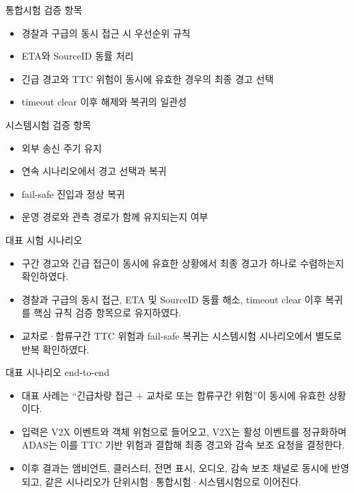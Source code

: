 \documentclass[aspectratio=169,10pt]{beamer}
\begin{document}
\begin{frame}{통합시험 검증 항목}
\begin{itemize}
  \item 경찰과 구급의 동시 접근 시 우선순위 규칙
  \item ETA와 SourceID 동률 처리
  \item 긴급 경고와 TTC 위험이 동시에 유효한 경우의 최종 경고 선택
  \item timeout clear 이후 해제와 복귀의 일관성
\end{itemize}
\end{frame}

\begin{frame}{시스템시험 검증 항목}
\begin{itemize}
  \item 외부 송신 주기 유지
  \item 연속 시나리오에서 경고 선택과 복귀
  \item fail-safe 진입과 정상 복귀
  \item 운영 경로와 관측 경로가 함께 유지되는지 여부
\end{itemize}
\end{frame}

\begin{frame}{대표 시험 시나리오}
\begin{itemize}
  \item 구간 경고와 긴급 접근이 동시에 유효한 상황에서 최종 경고가 하나로 수렴하는지 확인하였다.
  \item 경찰과 구급의 동시 접근, ETA 및 SourceID 동률 해소, timeout clear 이후 복귀를 핵심 규칙 검증 항목으로 유지하였다.
  \item 교차로·합류구간 TTC 위험과 fail-safe 복귀는 시스템시험 시나리오에서 별도로 반복 확인하였다.
\end{itemize}
\end{frame}

\begin{frame}{대표 시나리오 end-to-end}
\begin{itemize}
  \item 대표 사례는 ``긴급차량 접근 + 교차로 또는 합류구간 위험''이 동시에 유효한 상황이다.
  \item 입력은 V2X 이벤트와 객체 위험으로 들어오고, V2X는 활성 이벤트를 정규화하며 ADAS는 이를 TTC 기반 위험과 결합해 최종 경고와 감속 보조 요청을 결정한다.
  \item 이후 결과는 앰비언트, 클러스터, 전면 표시, 오디오, 감속 보조 채널로 동시에 반영되고, 같은 시나리오가 단위시험·통합시험·시스템시험으로 이어진다.
\end{itemize}
\end{frame}
\end{document}
